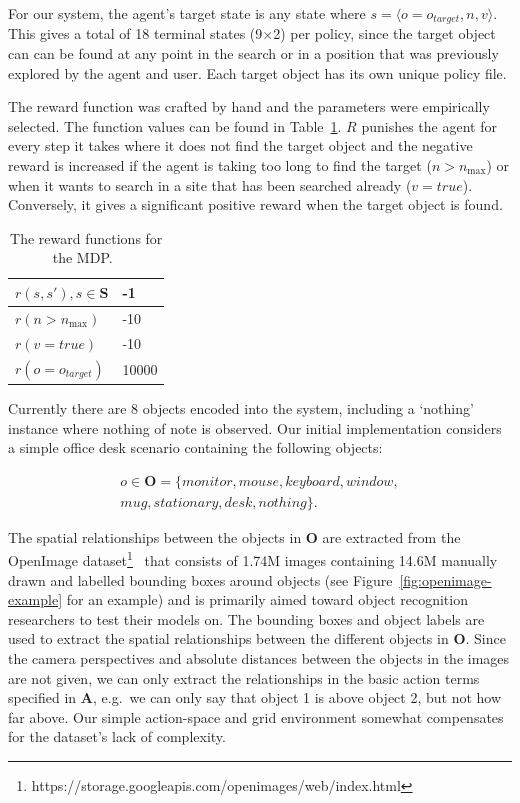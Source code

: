 \documentclass[a4paper, twoside]{article}
\begin{document}
For our system, the agent's target state is any state where $s = \langle{}o=o_{target}, n, v\rangle$. This gives a total of 18 terminal states (9$\times$2) per policy, since the target object can can be found at any point in the search or in a position that was previously explored by the agent and user. Each target object has its own unique policy file.

The reward function was crafted by hand and the parameters were empirically selected. The function values can be found in Table~\ref{tab:rewards}. $R$ punishes the agent for every step it takes where it does not find the target object and the negative reward is increased if the agent is taking too long to find the target ($n > n_{\max}$) or when it wants to search in a site that has been searched already ($v = true$). Conversely, it gives a significant positive reward when the target object is found. 

\begin{table}
  \centering
  \caption{The reward functions for the MDP.\ }\label{tab:rewards}
  \begin{tabular}{ll}
    \toprule
    $r(s, s'), s\in\mathbf{S}$ & -1  \\ \midrule
    $r(n > n_{\max})$ & -10 \\ \midrule
    $r(v = true)$  & -10 \\ \midrule
    $r(o = o_{target})$ & 10000 \\ \midrule
    \bottomrule
  \end{tabular}
\end{table}

Currently there are 8 objects encoded into the system, including a `nothing' instance where nothing of note is observed. Our initial implementation considers a simple office desk scenario containing the following objects:

\begin{equation}
  \begin{aligned}
    o\in \mathbf{O} = \{monitor, mouse, keyboard, window,\\mug, stationary, desk, nothing\}.
  \end{aligned}
\end{equation}

The spatial relationships between the objects in $\mathbf{O}$ are extracted from the OpenImage dataset\footnote{https://storage.googleapis.com/openimages/web/index.html}~\cite{openimages} that consists of 1.74M images containing 14.6M manually drawn and labelled bounding boxes around objects (see Figure~\ref{fig:openimage-example} for an example) and is primarily aimed toward object recognition researchers to test their models on. The bounding boxes and object labels are used to extract the spatial relationships between the different objects in $\mathbf{O}$. Since the camera perspectives and absolute distances between the objects in the images are not given, we can only extract the relationships in the basic action terms specified in $\mathbf{A}$, e.g.\ we can only say that object 1 is above object 2, but not how far above. Our simple action-space and grid environment somewhat compensates for the dataset's lack of complexity. 
\end{document}
